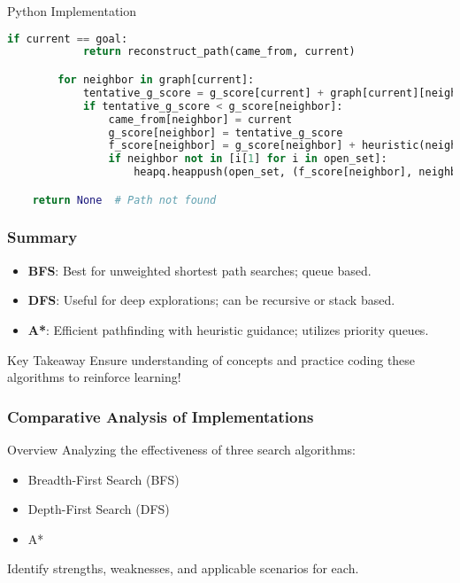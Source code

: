 \documentclass[aspectratio=169]{beamer}
\begin{document}
\begin{frame}[fragile]
\begin{block}{Python Implementation}
\begin{lstlisting}[language=Python]
        if current == goal:
            return reconstruct_path(came_from, current)

        for neighbor in graph[current]:
            tentative_g_score = g_score[current] + graph[current][neighbor]
            if tentative_g_score < g_score[neighbor]:
                came_from[neighbor] = current
                g_score[neighbor] = tentative_g_score
                f_score[neighbor] = g_score[neighbor] + heuristic(neighbor, goal)
                if neighbor not in [i[1] for i in open_set]:
                    heapq.heappush(open_set, (f_score[neighbor], neighbor))

    return None  # Path not found
    \end{lstlisting}
    \end{block}
\end{frame}

\begin{frame}
    \frametitle{Summary}
    \begin{itemize}
        \item \textbf{BFS}: Best for unweighted shortest path searches; queue based.
        \item \textbf{DFS}: Useful for deep explorations; can be recursive or stack based.
        \item \textbf{A*}: Efficient pathfinding with heuristic guidance; utilizes priority queues.
    \end{itemize}
    \begin{block}{Key Takeaway}
        Ensure understanding of concepts and practice coding these algorithms to reinforce learning!
    \end{block}
\end{frame}

\begin{frame}[fragile]
    \frametitle{Comparative Analysis of Implementations}
    \begin{block}{Overview}
        Analyzing the effectiveness of three search algorithms:
        \begin{itemize}
            \item Breadth-First Search (BFS)
            \item Depth-First Search (DFS)
            \item A*
        \end{itemize}
        Identify strengths, weaknesses, and applicable scenarios for each.
    \end{block}
\end{frame}
\end{document}
